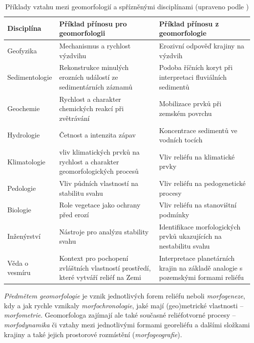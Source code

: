 \begin{table}[h]
	\begin{tabularx}{1\textwidth}{@{}lXX@{}}
		\toprule
		Disciplína   & Příklad přínosu pro geomorfologii                                         & Příklad přínosu z geomorfologie                                    \\ \midrule
		Geofyzika    & Mechanismus a rychlost výzdvihu                                           & Erozivní odpověď krajiny na výzdvih                                \\
		Sedimentologie &
		Rekonstrukce minulých erozních událostí ze sedimentárních záznamů &
		Podoba říčních koryt při interpretaci fluviálních sedimentů \\
		Geochemie    & Rychlost a charakter chemických reakcí při zvětrávání                     & Mobilizace prvků při zemském povrchu                               \\
		Hydrologie   & Četnost a intenzita zápav                                                 & Koncentrace sedimentů ve vodních tocích                            \\
		Klimatologie & vliv klimatických prvků na rychlost a charakter geomorfologických procesů & Vliv reliéfu na klimatické prvky                                   \\
		Pedologie    & Vliv půdních vlastností na stabilitu svahu                                & Vliv reliéfu na pedogenetické procesy                              \\
		Biologie     & Role vegetace jako ochrany před erozí                                     & Vliv reliéfu na stanovištní podmínky                               \\
		Inženýrství  & Nástroje pro analýzu stability svahu                                      & Identifikace morfologických prvků ukazujících na nestabilitu svahu \\
		Věda o vesmíru &
		Kontext pro pochopení zvláštních vlastností prostředí, které vytváří reliéf na Zemi &
		Interpretace planetárních krajin na základě analogie s pozemskými formami reliéfu \\ \bottomrule
	\end{tabularx}
	\caption{Příklady vztahu mezi geomorfologií a spřízněnými disciplínami (upraveno podle \textcite{summerfieldGlobalGeomorphologyIntroduction1999})}
	\label{tab:geom_a_dalsi}
\end{table}


\emph{Předmětem geomorfologie} je vznik jednotlivých forem reliéfu neboli \emph{morfogeneze}, kdy a jak rychle vznikaly \emph{morfochronologie}, jaké mají (geo)metrické vlastnosti -- \emph{morfometrie}. Geomorfologa zajímají ale také současné reliéfotvorné procesy -- \emph{morfodynamika} či vztahy mezi jednotlivými formami georeliéfu a dalšími složkami krajiny a také jejich prostorové rozmístění (\emph{morfogeografie}).

